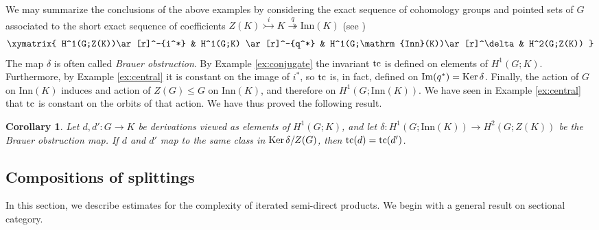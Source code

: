 \documentclass[11pt]{amsart}
\theoremstyle{plain}
\newtheorem{corollary}[theorem]{Corollary}
\theoremstyle{definition}
\newcommand{\Ker}{\mathop{\rm Ker}\nolimits}
\newcommand{\im}{\mathop{\rm Im}\nolimits}
\newcommand{\tc}{\mathop{\rm tc}\nolimits}
\begin{document}
We may summarize the conclusions of the above examples by considering 
the exact sequence of cohomology groups and pointed sets of $G$ associated to the short 
exact sequence of coefficients 
$Z(K)\stackrel{i}{\rightarrowtail} K\stackrel{q}{\twoheadrightarrow} \mathrm{Inn}(K)$
(see \cite[Ch. III]{Giraud1971})
$$
\xymatrix{
H^1(G;Z(K))\ar[r]^-{i^*} & H^1(G;K) \ar[r]^-{q^*} & H^1(G;\mathrm{Inn}(K))\ar[r]^\delta & H^2(G;Z(K))
}$$
The map $\delta$ is often called \emph{Brauer obstruction}.
By Example \ref{ex:conjugate} the invariant $\tc$ is defined on elements of $H^1(G;K)$. Furthermore, by
Example \ref{ex:central} it is constant on the image of $i^*$, so $\tc$ is, in fact, defined on 
$\im(q^*)=\Ker\delta$. Finally, the action of $G$ on $\mathrm{Inn}(K)$ induces and action of 
$Z(G)\le G$ on $\mathrm{Inn}(K)$, and therefore on $H^1(G;\mathrm{Inn}(K))$. We have seen in Example 
\ref{ex:central} that $\tc$ is constant on the orbits of that action. We have thus proved the following 
result.

\begin{corollary}
Let $d,d'\colon G\to K$ be derivations viewed as elements of $H^1(G;K)$, and let 
$\delta\colon H^1(G;\mathrm{Inn}(K))\to H^2(G;Z(K))$ be the Brauer obstruction map. 
If $d$ and $d'$ map to the same class in $\Ker\delta/Z(G)$, then $\tc(d)=\tc(d')$.
\end{corollary}


\subsection{Compositions of splittings} In this section, we describe estimates for the complexity of
iterated semi-direct products. We begin with a general result on sectional category. 
\end{document}
